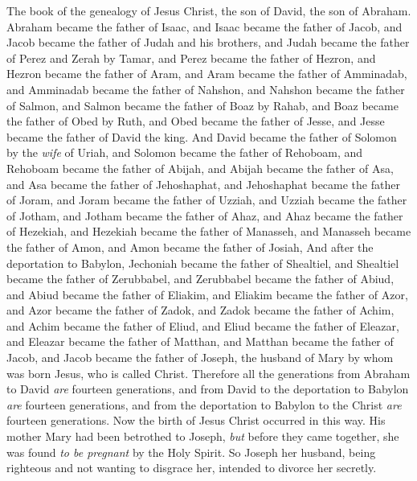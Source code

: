 
\begin{biblechapter} %
 The book of the genealogy of Jesus Christ, the son of David, the son of Abraham.
\verse Abraham became the father of Isaac, and Isaac became the father of Jacob, and Jacob became the father of Judah and his brothers,
\verse and Judah became the father of Perez and Zerah by Tamar, and Perez became the father of Hezron, and Hezron became the father of Aram,
\verse and Aram became the father of Amminadab, and Amminadab became the father of Nahshon, and Nahshon became the father of Salmon,
\verse and Salmon became the father of Boaz by Rahab, and Boaz became the father of Obed by Ruth, and Obed became the father of Jesse,
\verse and Jesse became the father of David the king.
\verse And David became the father of Solomon by the \textit{wife} of Uriah,
\verse and Solomon became the father of Rehoboam, and Rehoboam became the father of Abijah, and Abijah became the father of Asa,
\verse and Asa became the father of Jehoshaphat, and Jehoshaphat became the father of Joram, and Joram became the father of Uzziah,
\verse and Uzziah became the father of Jotham, and Jotham became the father of Ahaz, and Ahaz became the father of Hezekiah,
\verse and Hezekiah became the father of Manasseh, and Manasseh became the father of Amon, and Amon became the father of Josiah,
\verse And after the deportation to Babylon, Jechoniah became the father of Shealtiel, and Shealtiel became the father of Zerubbabel,
\verse and Zerubbabel became the father of Abiud, and Abiud became the father of Eliakim, and Eliakim became the father of Azor,
\verse and Azor became the father of Zadok, and Zadok became the father of Achim, and Achim became the father of Eliud,
\verse and Eliud became the father of Eleazar, and Eleazar became the father of Matthan, and Matthan became the father of Jacob,
\verse and Jacob became the father of Joseph, the husband of Mary by whom was born Jesus, who is called Christ.
\verse Therefore all the generations from Abraham to David \textit{are} fourteen generations, and from David to the deportation to Babylon \textit{are} fourteen generations, and from the deportation to Babylon to the Christ \textit{are} fourteen generations.
 Now the birth of Jesus Christ occurred in this way. His mother Mary had been betrothed to Joseph, \textit{but} before they came together, she was found \textit{to be pregnant} by the Holy Spirit.
\verse So Joseph her husband, being righteous and not wanting to disgrace her, intended to divorce her secretly.

\end{biblechapter}
